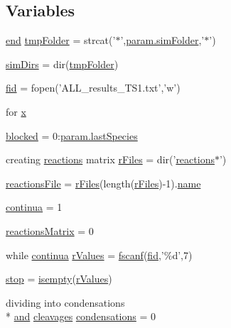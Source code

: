 \subsection*{Variables}
\begin{DoxyCompactItemize}
\item 
\hyperlink{a00025_afb358f48b1646c750fb9da6c6585be2b}{end} \hyperlink{a00029_ad509473eed851f9f5ff4157c02ec8618}{tmp\-Folder} = strcat('$\ast$',\hyperlink{a00032_aa671e3345005bd599e662bcaa115b18a}{param.\-sim\-Folder},'$\ast$')
\item 
\hyperlink{a00029_aae5035eb84b89176ed5b06e136325eff}{sim\-Dirs} = dir(\hyperlink{a00029_ad509473eed851f9f5ff4157c02ec8618}{tmp\-Folder})
\item 
\hyperlink{a00029_ae9011d40c6f13e68e6f07156e0da7c5d}{fid} = fopen('A\-L\-L\-\_\-results\-\_\-\-T\-S1.\-txt','w')
\item 
for \hyperlink{a00029_a7265972fe485274cfff77a9bb07b8fce}{x}
\item 
\hyperlink{a00029_a1faaaae288fc8ca4ed1751049aa2f84f}{blocked} = 0\-:\hyperlink{a00032_aad7be196243f3c9ca83dfee7c9111014}{param.\-last\-Species}
\item 
creating \hyperlink{a00021}{reactions} matrix \hyperlink{a00029_ad75735665492cabd747370126464fddf}{r\-Files} = dir('\hyperlink{a00021}{reactions}$\ast$')
\item 
\hyperlink{a00029_a4c72dba1fe2ee2fbcc699262a8d0c624}{reactions\-File} = \hyperlink{a00030_ad75735665492cabd747370126464fddf}{r\-Files}(length(\hyperlink{a00030_ad75735665492cabd747370126464fddf}{r\-Files})-\/1).\hyperlink{a00027_abbf559a76fab59203496b0847ab9502a}{name}
\item 
\hyperlink{a00029_a9c951ebd5bc3f1adce943bee1255f4d6}{continua} = 1
\item 
\hyperlink{a00029_ac52097a2745fcef31eb175d2e9485845}{reactions\-Matrix} = 0
\item 
while \hyperlink{a00030_a9c951ebd5bc3f1adce943bee1255f4d6}{continua} \hyperlink{a00029_a436a6968124e560649654a4abbd9dac6}{r\-Values} = \hyperlink{a00025_a028ac102a731e62fb0a7439381f566c1}{fscanf}(\hyperlink{a00031_ae9011d40c6f13e68e6f07156e0da7c5d}{fid},'\%d',7)
\item 
\hyperlink{a00029_a6bd08e37edf4151f5f6d1fc27a6f227a}{stop} = \hyperlink{a00025_ac10445404f4b83302522defb59e25ef7}{isempty}(\hyperlink{a00030_a436a6968124e560649654a4abbd9dac6}{r\-Values})
\item 
dividing into condensations \\*
\hyperlink{a00028_a170f8acb213f91bf71c77b1d20bceb33}{and} \hyperlink{a00030_a89060c6979e5a4ff7b0985b35f295695}{cleavages} \hyperlink{a00029_ad3aa27d88a7e9d77d8334155860269bb}{condensations} = 0

\end{DoxyCompactItemize}
